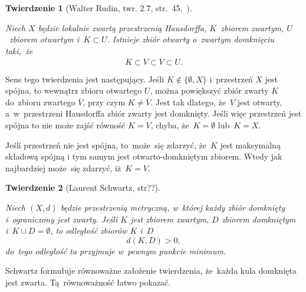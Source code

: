 \documentclass[a4paper,11pt]{article}
\newtheorem{theorem}{Twierdzenie}
\begin{document}
\begin{theorem}[Walter Rudin, twr. 2.7,
  str.~45,~\cite{RudinAnalizaRzeczywistaIZespolona1998}]
  \label{thm:Zemanian-01}

  Niech $X$ będzie lokalnie zwartą przestrzenią Hausdorffa,
  $K$~zbiorem zwartym, $U$~zbiorem otwartym i~$K \subset U$. Istnieje
  zbiór otwarty o~zwartym domknięciu taki,~że
  \begin{equation}
    \label{eq:Zemanian-04}
    K \subset V \subset \overline{ V } \subset U.
  \end{equation}

\end{theorem}





Sens tego twierdzenia jest następujący. Jeśli $K \notin \{ \emptyset, X \}$
i~przestrzeń $X$ jest spójna, to wewnątrz zbioru otwartego $U$, można
powiększyć zbiór zwarty $K$ do~zbioru zwartego $\overline{ V }$, przy czym
$K \neq \overline{ V }$. Jest tak dlatego, że~$V$ jest otwarty,
a~w~przestrzeni Hausdorffa zbiór zwarty jest domknięty. Jeśli więc
przestrzeń jest spójna to nie może zajść równość $K = V$, chyba,
że~$K = \emptyset$ lub~$K = X$.

Jeśli przestrzeń nie jest spójna, to~może~się zdarzyć, że~$K$ jest
maksymalną składową spójną i tym samym jest otwarto-domkniętym
zbiorem. Wtedy jak najbardziej może~się zdarzyć, iż~$K = V$.





\begin{theorem}[Laurent Schwartz,
  str??\cite{SchwartzKursAnalizyMatematycznejVolI1979}]
  \label{thm:Zemanian-02}

  Niech $( X, d )$ będzie przestrzenią metryczną, w~której każdy zbiór
  domknięty i~ograniczony jest zwarty. Jeśli $K$ jest zbiorem zwartym,
  $D$ zbiorem domkniętym i~$K \cup D = \emptyset$, to odległość zbiorów $K$
  i~$D$
  \begin{equation}
    \label{eq:Zem-s01-05}
    d( K, D ) > 0,
  \end{equation}
  do~tego odległość ta przyjmuje w~pewnym punkcie minimum.

\end{theorem}





\noindent
Schwartz formułuje równoważne założenie twierdzenia, że~każda
kula domknięta jest zwarta. Tą~równoważność łatwo pokazać.
\end{document}
